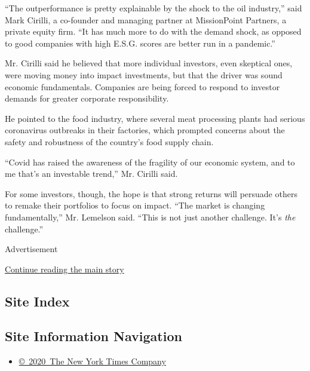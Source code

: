``The outperformance is pretty explainable by the shock to the oil
industry,'' said Mark Cirilli, a co-founder and managing partner at
MissionPoint Partners, a private equity firm. ``It has much more to do
with the demand shock, as opposed to good companies with high E.S.G.
scores are better run in a pandemic.''

Mr. Cirilli said he believed that more individual investors, even
skeptical ones, were moving money into impact investments, but that the
driver was sound economic fundamentals. Companies are being forced to
respond to investor demands for greater corporate responsibility.

He pointed to the food industry, where several meat processing plants
had serious coronavirus outbreaks in their factories, which prompted
concerns about the safety and robustness of the country's food supply
chain.

``Covid has raised the awareness of the fragility of our economic
system, and to me that's an investable trend,'' Mr. Cirilli said.

For some investors, though, the hope is that strong returns will
persuade others to remake their portfolios to focus on impact. ``The
market is changing fundamentally,'' Mr. Lemelson said. ``This is not
just another challenge. It's \emph{the} challenge.''

Advertisement

\protect\hyperlink{after-bottom}{Continue reading the main story}

\hypertarget{site-index}{%
\subsection{Site Index}\label{site-index}}

\hypertarget{site-information-navigation}{%
\subsection{Site Information
Navigation}\label{site-information-navigation}}

\begin{itemize}
\tightlist
\item
  \href{https://help.nytimes3xbfgragh.onion/hc/en-us/articles/115014792127-Copyright-notice}{©~2020~The
  New York Times Company}
\end{itemize}

